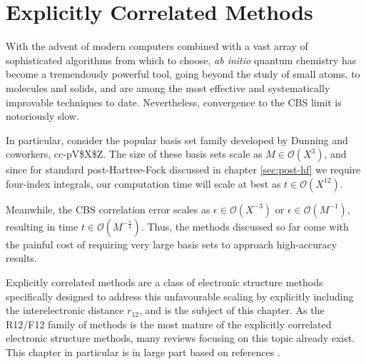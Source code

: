 \chapter{Explicitly Correlated Methods}
\label{chap:explicit}

With the advent of modern computers combined with a vast array of sophisticated algorithms from which to choose, \emph{ab initio} quantum chemistry has become a tremendously powerful tool, going beyond the study of small atoms, to molecules and solids, and are among the most effective and systematically improvable techniques to date. Nevertheless, convergence to the \gls{CBS} limit is notoriously slow.

In particular, consider the popular basis set family developed by Dunning and coworkers, \gls{cc-pV$X$Z}.\cite{dunningGaussian1989,woonGaussian1993,woonGaussian1994,petersonBenchmark1994,wilsonGaussian1996}
The size of these basis sets scale as $M\in\mathcal{O}(X^3)$, and since for standard post-Hartree-Fock discussed in chapter \ref{sec:post-hf} we require four-index integrals, our computation time will scale at best as $t\in\mathcal{O}(X^{12})$.\cite{klopperR122007}

Meanwhile, the \gls{CBS} correlation error scales as $\epsilon\in\mathcal{O}(X^{-3})$ \cite{helgakerBasisset1997,halkierBasisset1998} or $\epsilon\in\mathcal{O}(M^{-1})$,\cite{klopperInitio1995} resulting in time $t\in\mathcal{O}(M^{-\frac 14})$. Thus, the methods discussed so far come with the painful cost of requiring very large basis sets to approach high-accuracy results.

Explicitly correlated methods are a class of electronic structure methods specifically designed to address this unfavourable scaling by explicitly including the interelectronic distance $r_{12}$, and is the subject of this chapter. As the R12/F12 family of methods is the most mature of the explicitly correlated electronic structure methods, many reviews focusing on this topic already exist. This chapter in particular is in large part based on references \parencite{klopperR122007,gruneisPerspective2017,hattigExplicitly2011,shiozakiMultireference2013}.




